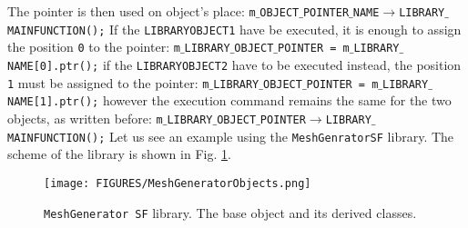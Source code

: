 \documentclass[11pt,a4paper,oneside]{article}
\begin{document}
The pointer is then used on object's place:
\newline
\newline
\hspace*{1cm}
\texttt{m$\_$OBJECT$\_$POINTER$\_$NAME$\rightarrow$LIBRARY$\_$MAINFUNCTION();}
\newline
\newline
If the \texttt{LIBRARYOBJECT1} have be executed, it is enough to assign the position \texttt{0} to the pointer:
\newline
\newline
\hspace*{0.8cm}
\texttt{m$\_$LIBRARY$\_$OBJECT$\_$POINTER = m$\_$LIBRARY$\_$NAME[0].ptr();}
\newline
\newline
if the \texttt{LIBRARYOBJECT2} have to be executed instead, the position \texttt{1} must be assigned to the pointer:
\newline
\newline
\hspace*{0.8cm}
\texttt{m$\_$LIBRARY$\_$OBJECT$\_$POINTER = m$\_$LIBRARY$\_$NAME[1].ptr();}
\newline
\newline
however the execution command remains the same for the two objects, as written before:
\newline
\newline
\hspace*{0.8cm}
\texttt{m$\_$LIBRARY$\_$OBJECT$\_$POINTER$\rightarrow$LIBRARY$\_$MAINFUNCTION();}
\newline
\newline
Let us see an example using the \texttt{MeshGenratorSF} library. The scheme of the library is shown in Fig. \ref{fig:mesh generator objects}.
\begin{figure}[htp]
\center
\texttt{[image: FIGURES/MeshGeneratorObjects.png]}
\caption{\texttt{MeshGenerator SF} library. The base object and its derived classes.} \label{fig:mesh generator objects}
\end{figure}
\end{document}
